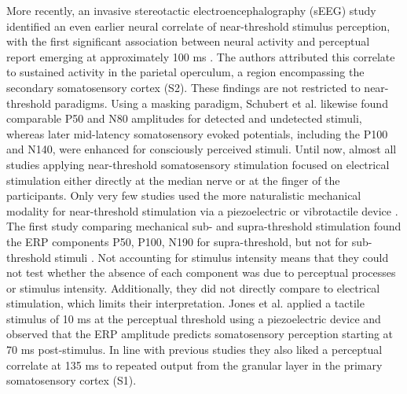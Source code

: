 \documentclass[11pt,a4paper,onecolumn]{article}
\begin{document}
More recently, an invasive stereotactic electroencephalography (sEEG) study identified an even earlier neural correlate of near-threshold stimulus perception, with the first significant association between neural activity and perceptual report emerging at approximately 100 ms \cite{albertiniConsciousTactilePerception2025}. The authors attributed this correlate to sustained activity in the parietal operculum, a region encompassing the secondary somatosensory cortex (S2).
These findings are not restricted to near-threshold paradigms. Using a masking paradigm, Schubert et al. \cite{schubertNowYouFeel2006} likewise found comparable P50 and N80 amplitudes for detected and undetected stimuli, whereas later mid-latency somatosensory evoked potentials, including the P100 and N140, were enhanced for consciously perceived stimuli.
Until now, almost all studies applying near-threshold somatosensory stimulation focused on electrical stimulation either directly at the median nerve or at the finger of the participants.
Only very few studies used the more naturalistic mechanical modality for near-threshold stimulation via a piezoelectric or vibrotactile device \cite{soininenSomatosensoryEvokedPotentials1983, jonesNeuralCorrelatesTactile2007, gussoMoreFeelingScalp2021, forsterERPResponsesReveal2025}. 
The first study comparing mechanical sub- and supra-threshold stimulation found the ERP components P50, P100, N190 for supra-threshold, but not for sub-threshold stimuli \cite{soininenSomatosensoryEvokedPotentials1983}.  Not accounting for stimulus intensity means that they could not test whether the absence of each component was due to perceptual processes or stimulus intensity. Additionally, they did not directly compare to electrical stimulation, which limits their interpretation.
Jones et al. \cite{jonesNeuralCorrelatesTactile2007} applied a tactile stimulus of 10 ms at the perceptual threshold using a piezoelectric device and observed that the ERP amplitude predicts somatosensory perception starting at 70 ms post-stimulus. In line with previous studies they also liked a perceptual correlate at 135 ms to repeated output from the granular layer in the primary somatosensory cortex (S1). 
\end{document}

